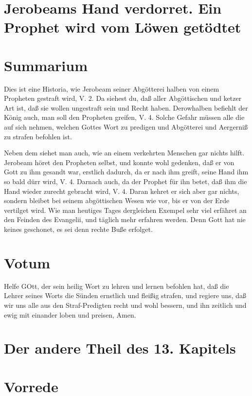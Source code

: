 \section[Jerobeams Hand verdorret. Ein Prophet wird vom Löwen]{Jerobeams Hand verdorret. Ein Prophet wird vom Löwen getödtet}

\section{Summarium}

Dies ist eine Historia, wie Jerobeam seiner Abgötterei halben von einem Propheten gestraft wird, V. 2. Da siehest du, daß aller Abgöttischen und ketzer Art ist, daß sie wollen ungestraft sein und Recht haben. Derowhalben befiehlt der König auch, man soll den Propheten greifen, V. 4. Solche Gefahr müssen alle die auf sich nehmen, welchen Gottes Wort zu predigen und Abgötterei und Aergerniß zu strafen befohlen ist.

Neben dem siehet man auch, wie an einem verkehrten Menschen gar nichts hilft. Jerobeam höret den Propheten selbst, und konnte wohl gedenken, daß er von Gott zu ihm gesandt war, erstlich dadurch, da er nach ihm greift, seine Hand ihm so bald dürr wird, V. 4. Darnach auch, da der Prophet für ihn betet, daß ihm die Hand wieder zurecht gebracht wird, V. 4. Daran kehret er sich aber gar nichts, sondern bleibet
bei seinem abgöttischen Wesen wie vor, bis er von der Erde vertilget wird. Wie man heutiges Tages dergleichen Exempel sehr viel erfähret an den Feinden des Evangelii, und täglich mehr erfahren werden. Denn Gott hat nie keines geschonet, es sei denn rechte Buße erfolget.

\section{Votum}

Helfe GOtt, der sein heilig Wort zu lehren und lernen befohlen hat, daß die Lehrer seines Worts die Sünden ernstlich und fleißig strafen, und regiere uns, daß wir uns alle aus den Straf-Predigten recht und wohl bessern, und ihn zeitlich und ewig mit einander loben und preisen, Amen.

\section{Der andere Theil des 13. Kapitels}

\section{Vorrede}

